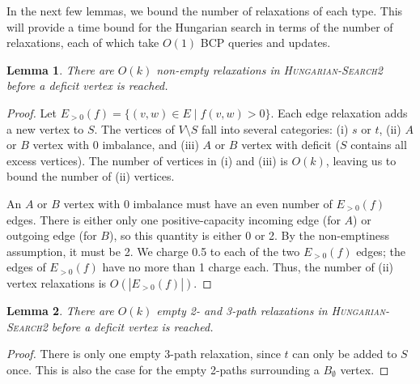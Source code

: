 \documentclass[11pt]{article}
\def\eps{\varepsilon}
\theoremstyle{plain}
\newtheorem{lemma}{Lemma}
\begin{document}
\begin{figure*}




In the next few lemmas, we bound the number of relaxations of each type.
This will provide a time bound for the Hungarian search in terms of the
number of relaxations, each of which take $O(1)$ BCP queries and updates.

\begin{lemma}
\label{lemma:goldberg_hs_length1}
There are $O(k)$ non-empty relaxations in \textsc{Hungarian-Search2} before a
deficit vertex is reached.
\end{lemma}

\begin{proof}
Let $E_{>0}(f) = \{(v, w) \in E \mid f(v, w) > 0\}$.
Each edge relaxation adds a new vertex to $S$.
The vertices of $V \setminus S$ fall into several categories:
(i) $s$ or $t$, (ii) $A$ or $B$ vertex with 0 imbalance, and (iii) $A$ or $B$
vertex with deficit ($S$ contains all excess vertices).
The number of vertices in (i) and (iii) is $O(k)$, leaving us to bound the
number of (ii) vertices.

An $A$ or $B$ vertex with 0 imbalance must have an even number of $E_{>0}(f)$
edges.
There is either only one positive-capacity incoming edge (for $A$) or outgoing
edge (for $B$), so this quantity is either 0 or 2.
By the non-emptiness assumption, it must be 2.
We charge 0.5 to each of the two $E_{>0}(f)$ edges; the edges of $E_{>0}(f)$
have no more than 1 charge each.
Thus, the number of (ii) vertex relaxations is $O(|E_{>0}(f)|)$.
\end{proof}

\begin{lemma}
\label{lemma:goldberg_hs_length2}
There are $O(k)$ empty 2- and 3-path relaxations in \textsc{Hungarian-Search2}
before a deficit vertex is reached.
\end{lemma}

\begin{proof}
There is only one empty 3-path relaxation, since $t$ can only be added to $S$
once.
This is also the case for the empty 2-paths surrounding a $B_\emptyset$ vertex.


\end{proof}
\end{figure*}
\end{document}
